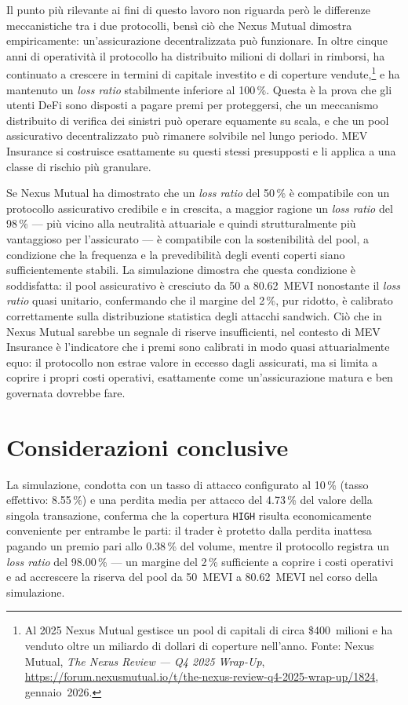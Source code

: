 \documentclass[a4paper,11pt]{article}
\begin{document}
Il punto più rilevante ai fini di questo lavoro non riguarda però le differenze
meccanistiche tra i due protocolli, bensì ciò che Nexus Mutual dimostra
empiricamente: un'assicurazione decentralizzata può funzionare. In oltre cinque
anni di operatività il protocollo ha distribuito milioni di dollari in rimborsi,
ha continuato a crescere in termini di capitale investito e di coperture
vendute,\footnote{Al 2025 Nexus Mutual gestisce un pool di capitali di circa
\$400~milioni e ha venduto oltre un miliardo di dollari di coperture nell'anno.
Fonte: Nexus Mutual, \textit{The Nexus Review --- Q4 2025 Wrap-Up},
\url{https://forum.nexusmutual.io/t/the-nexus-review-q4-2025-wrap-up/1824},
gennaio~2026.} e ha mantenuto un \emph{loss ratio} stabilmente inferiore al
\num{100}\,\%. Questa è la prova che gli utenti DeFi sono disposti a pagare
premi per proteggersi, che un meccanismo distribuito di verifica dei sinistri
può operare equamente su scala, e che un pool assicurativo decentralizzato può
rimanere solvibile nel lungo periodo. MEV Insurance si costruisce esattamente
su questi stessi presupposti e li applica a una classe di rischio più granulare.

Se Nexus Mutual ha dimostrato che un \emph{loss ratio} del \num{50}\,\% è
compatibile con un protocollo assicurativo credibile e in crescita, a maggior
ragione un \emph{loss ratio} del \num{98}\,\% --- più vicino alla neutralità
attuariale e quindi strutturalmente più vantaggioso per l'assicurato --- è
compatibile con la sostenibilità del pool, a condizione che la frequenza e la
prevedibilità degli eventi coperti siano sufficientemente stabili. La
simulazione dimostra che questa condizione è soddisfatta: il pool assicurativo è
cresciuto da \num{50} a \num{80,62}~MEVI nonostante il \emph{loss ratio} quasi
unitario, confermando che il margine del \num{2}\,\%, pur ridotto, è calibrato
correttamente sulla distribuzione statistica degli attacchi sandwich. Ciò che in
Nexus Mutual sarebbe un segnale di riserve insufficienti, nel contesto di MEV
Insurance è l'indicatore che i premi sono calibrati in modo quasi attuarialmente
equo: il protocollo non estrae valore in eccesso dagli assicurati, ma si limita
a coprire i propri costi operativi, esattamente come un'assicurazione matura e
ben governata dovrebbe fare.


\section{Considerazioni conclusive}
La simulazione, condotta con un tasso di attacco configurato al 10\,\% (tasso
effettivo: \num{8,55}\,\%) e una perdita media per attacco del \num{4,73}\,\%
del valore della singola transazione, conferma che la copertura \texttt{HIGH}
risulta economicamente conveniente per entrambe le parti: il trader è protetto
dalla perdita inattesa pagando un premio pari allo \num{0,38}\,\% del volume,
mentre il protocollo registra un \emph{loss ratio} del \num{98,00}\,\% --- un
margine del \num{2}\,\% sufficiente a coprire i costi operativi e ad accrescere
la riserva del pool da \num{50}~MEVI a \num{80,62}~MEVI nel corso della
simulazione.
\end{document}
